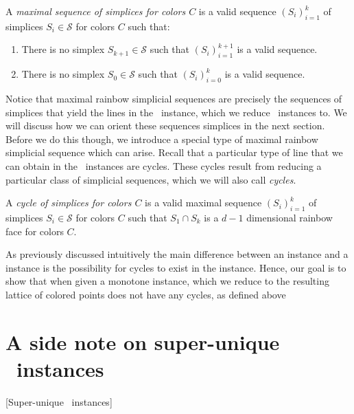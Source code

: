 \begin{definition}
	A \emph{maximal sequence of simplices for colors $C$} is a valid sequence $\left(S_i\right)_{i=1}^{k}$ of simplices $S_i \in \mathcal{S}$ for colors $C$ such that:
	\begin{enumerate}
		\item There is no simplex $S_{k+1} \in \mathcal{S}$ such that $\left(S_i\right)_{i=1}^{k+1}$ is a valid sequence.
		\item There is no simplex $S_{0} \in \mathcal{S}$ such that $\left(S_i\right)_{i=0}^{k}$ is a valid sequence.
	\end{enumerate}
\end{definition}

Notice that maximal rainbow simplicial sequences are precisely the sequences of simplices that yield the lines in the \EndOfLine\ instance, which we reduce \Sperner\ instances to. We will discuss how we can orient these sequences simplices in the next section. Before we do this though, we introduce a special type of maximal rainbow simplicial sequence which can arise. Recall that a particular type of line that we can obtain in the \EndOfLine\ instances are cycles. These cycles result from reducing a particular class of simplicial sequences, which we will also call \emph{cycles}.

\begin{definition}[Cycle]
	A \emph{cycle of simplices for colors $C$} is a valid maximal sequence $\left(S_i\right)_{i=1}^{k}$ of simplices $S_i \in \mathcal{S}$ for colors $C$ such that $S_1 \cap S_k$ is a $d-1$ dimensional rainbow face for colors $C$.
\end{definition}

As previously discussed intuitively the main difference between an \EndOfLine instance and a \EndOfPotentialLine instance is the possibility for cycles to exist in the \EndOfLine instance. Hence, our goal is to show that when given a monotone \Tarskistar instance, which we reduce to \Sperner the resulting lattice of colored points does not have any cycles, as defined above

\section{A side note on super-unique \Tarski\ instances}[Super-unique \Tarski\ instances]

